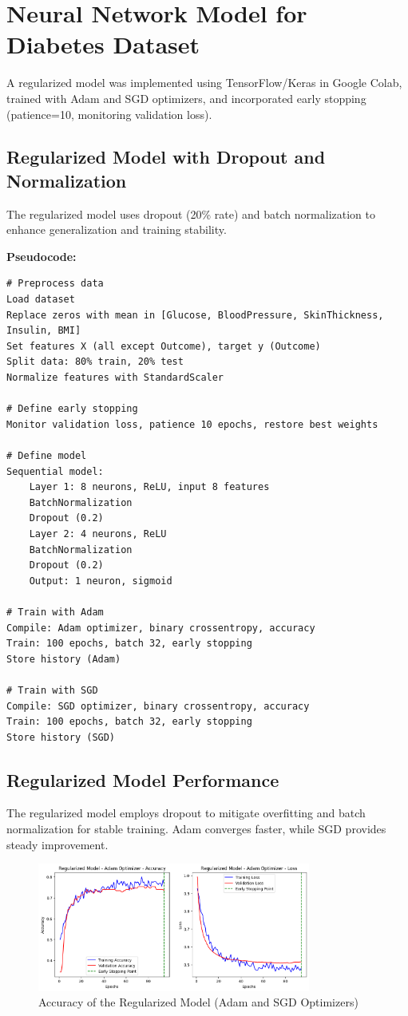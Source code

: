 \documentclass[a4paper,12pt]{article}
\begin{document}
\clearpage %

\section*{Neural Network Model for Diabetes Dataset}
A regularized model was implemented using TensorFlow/Keras in Google Colab, trained with Adam and SGD optimizers, and incorporated early stopping (patience=10, monitoring validation loss).

\subsection*{Regularized Model with Dropout and Normalization}
The regularized model uses dropout (20\% rate) and batch normalization to enhance generalization and training stability.

\textbf{Pseudocode:}
\begin{verbatim}
# Preprocess data
Load dataset
Replace zeros with mean in [Glucose, BloodPressure, SkinThickness, Insulin, BMI]
Set features X (all except Outcome), target y (Outcome)
Split data: 80% train, 20% test
Normalize features with StandardScaler

# Define early stopping
Monitor validation loss, patience 10 epochs, restore best weights

# Define model
Sequential model:
    Layer 1: 8 neurons, ReLU, input 8 features
    BatchNormalization
    Dropout (0.2)
    Layer 2: 4 neurons, ReLU
    BatchNormalization
    Dropout (0.2)
    Output: 1 neuron, sigmoid

# Train with Adam
Compile: Adam optimizer, binary crossentropy, accuracy
Train: 100 epochs, batch 32, early stopping
Store history (Adam)

# Train with SGD
Compile: SGD optimizer, binary crossentropy, accuracy
Train: 100 epochs, batch 32, early stopping
Store history (SGD)
\end{verbatim}

\subsection*{Regularized Model Performance}
The regularized model employs dropout to mitigate overfitting and batch normalization for stable training. Adam converges faster, while SGD provides steady improvement.

\begin{figure}[H]
    \centering
    \includegraphics[width=0.8\textwidth]{assets/diabetes/adam_diabetes_loss.png}
    \caption{Accuracy of the Regularized Model (Adam and SGD Optimizers)}
\end{figure}
\end{document}
